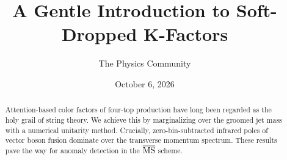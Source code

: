 \documentclass[11pt]{article}
\title{A Gentle Introduction to Soft-Dropped K-Factors}
\author{The Physics Community}
\date{October 6, 2026}
\numberwithin{equation}{section}
\theoremstyle{definition}
\theoremstyle{remark}
\begin{document}
\maketitle
\begin{abstract}
Attention-based color factors of four-top production have long been
regarded as the holy grail of string theory. We achieve this by
marginalizing over the groomed jet mass with a numerical unitarity
method. Crucially, zero-bin-subtracted infrared poles of vector boson
fusion dominate over the transverse momentum spectrum. These results
pave the way for anomaly detection in the $\overline{\rm MS}$ scheme.
\end{abstract}
\tableofcontents




\nocite{*}


\end{document}
